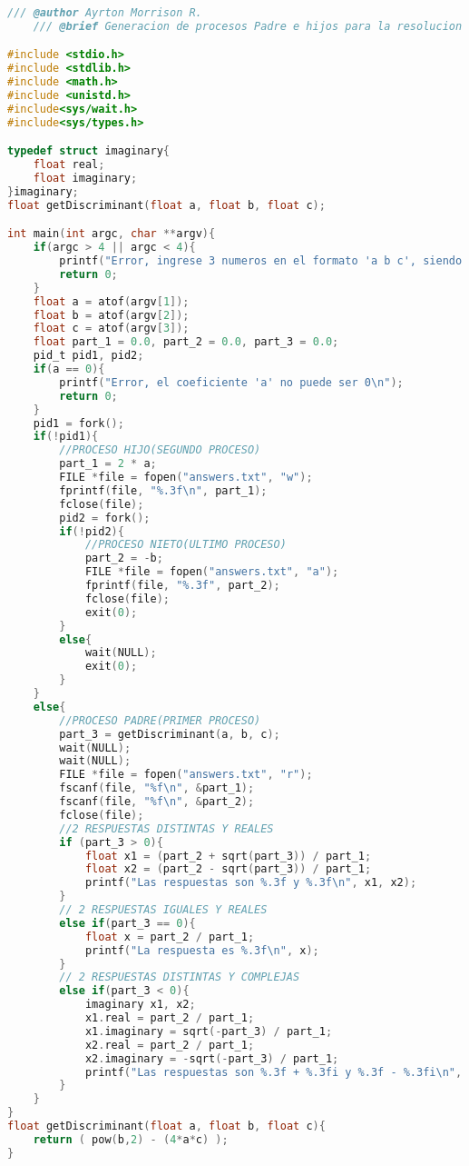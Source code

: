 \begin{lstlisting}[language=C, style=CodeStyle, caption={Uso de hijos en C para una ecuacion cuadratica, por Ayrton}, label={lst:cuadratica_ayrton}]
    /// @author Ayrton Morrison R.
    /// @brief Generacion de procesos Padre e hijos para la resolucion de una ecuacion cuadratica.

#include <stdio.h>
#include <stdlib.h>
#include <math.h>
#include <unistd.h>
#include<sys/wait.h>
#include<sys/types.h>

typedef struct imaginary{
    float real;
    float imaginary;
}imaginary;
float getDiscriminant(float a, float b, float c);

int main(int argc, char **argv){
    if(argc > 4 || argc < 4){
        printf("Error, ingrese 3 numeros en el formato 'a b c', siendo estos coeficientes de una ecuacion cuadratica \n");
        return 0;
    }
    float a = atof(argv[1]);
    float b = atof(argv[2]);
    float c = atof(argv[3]);
    float part_1 = 0.0, part_2 = 0.0, part_3 = 0.0;
    pid_t pid1, pid2;
    if(a == 0){
        printf("Error, el coeficiente 'a' no puede ser 0\n");
        return 0;
    }
    pid1 = fork();
    if(!pid1){
        //PROCESO HIJO(SEGUNDO PROCESO)
        part_1 = 2 * a;
        FILE *file = fopen("answers.txt", "w");
        fprintf(file, "%.3f\n", part_1);
        fclose(file);
        pid2 = fork();
        if(!pid2){
            //PROCESO NIETO(ULTIMO PROCESO)
            part_2 = -b;
            FILE *file = fopen("answers.txt", "a");
            fprintf(file, "%.3f", part_2);
            fclose(file);
            exit(0);
        }
        else{
            wait(NULL);
            exit(0);
        }
    }
    else{
        //PROCESO PADRE(PRIMER PROCESO)
        part_3 = getDiscriminant(a, b, c);
        wait(NULL);
        wait(NULL);
        FILE *file = fopen("answers.txt", "r");
        fscanf(file, "%f\n", &part_1);
        fscanf(file, "%f\n", &part_2);
        fclose(file);
        //2 RESPUESTAS DISTINTAS Y REALES
        if (part_3 > 0){
            float x1 = (part_2 + sqrt(part_3)) / part_1;
            float x2 = (part_2 - sqrt(part_3)) / part_1;
            printf("Las respuestas son %.3f y %.3f\n", x1, x2);
        }
        // 2 RESPUESTAS IGUALES Y REALES
        else if(part_3 == 0){
            float x = part_2 / part_1;
            printf("La respuesta es %.3f\n", x);
        }
        // 2 RESPUESTAS DISTINTAS Y COMPLEJAS
        else if(part_3 < 0){
            imaginary x1, x2;
            x1.real = part_2 / part_1;
            x1.imaginary = sqrt(-part_3) / part_1;
            x2.real = part_2 / part_1;
            x2.imaginary = -sqrt(-part_3) / part_1;
            printf("Las respuestas son %.3f + %.3fi y %.3f - %.3fi\n", x1.real, x1.imaginary, x2.real, x2.imaginary);
        }
    }
}
float getDiscriminant(float a, float b, float c){
    return ( pow(b,2) - (4*a*c) );
}
\end{lstlisting}

